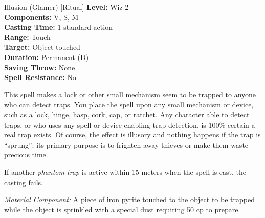 {Illusion (Glamer) [Ritual]}
{
	\textbf{Level:}
	Wiz 2\\
	\textbf{Components:}
	V, S, M\\
	\textbf{Casting Time:}
	1 standard action\\
	\textbf{Range:}
	Touch\\
	\textbf{Target:}
	Object touched\\
	\textbf{Duration:}
	Permanent (D)\\
	\textbf{Saving Throw:}
	None\\
	\textbf{Spell Resistance:}
	No\\
}
{
	This spell makes a lock or other small mechanism seem to be trapped to anyone who can detect traps. You place the spell upon any small mechanism or device, such as a lock, hinge, hasp, cork, cap, or ratchet. Any character able to detect traps, or who uses any spell or device enabling trap detection, is 100\% certain a real trap exists. Of course, the effect is illusory and nothing happens if the trap is ``sprung''; its primary purpose is to frighten away thieves or make them waste precious time.

	If another \emph{phantom trap} is active within 15 meters when the spell is cast, the casting fails.

	\textit{Material Component:}
	A piece of iron pyrite touched to the object to be trapped while the object is sprinkled with a special dust requiring 50 cp to prepare.

}

